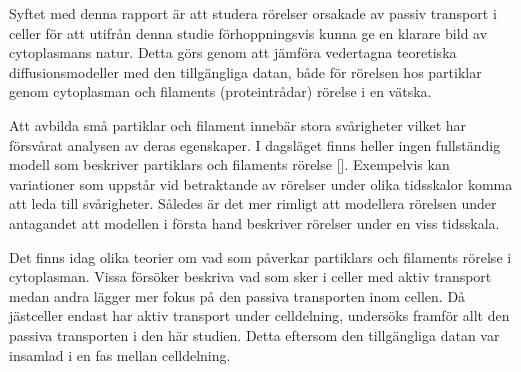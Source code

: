 Syftet med denna rapport är att studera rörelser orsakade av passiv transport i celler för att utifrån denna studie förhoppningsvis kunna ge en klarare bild av cytoplasmans natur. Detta görs genom att jämföra vedertagna teoretiska diffusionsmodeller med den tillgängliga datan, både för rörelsen hos partiklar genom cytoplasman och filaments (proteintrådar) rörelse i en vätska. %


Att avbilda små partiklar och filament innebär stora svårigheter vilket har försvårat analysen av deras egenskaper. I dagsläget finns heller ingen fullständig modell som beskriver partiklars och filaments rörelse []. %
Exempelvis kan variationer som uppstår vid betraktande av rörelser under olika tidsskalor komma att leda till svårigheter. %
Således är det mer rimligt att modellera rörelsen under antagandet att modellen i första hand beskriver rörelser under en viss tidsskala.%

Det finns idag olika teorier om vad som påverkar partiklars och filaments rörelse i cytoplasman. Vissa försöker beskriva vad som sker i celler med aktiv transport medan andra lägger mer fokus på den passiva transporten inom cellen. Då jästceller endast har aktiv transport under celldelning, undersöks framför allt den passiva transporten i den här studien. Detta eftersom den tillgängliga datan var insamlad i en fas mellan celldelning. 









